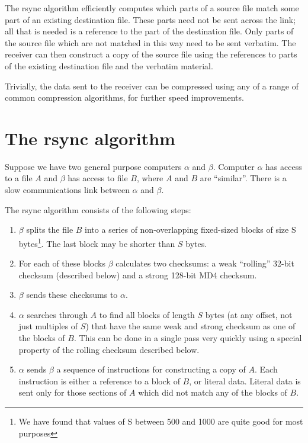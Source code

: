 \documentclass[a4paper]{article}
\begin{document}
The rsync algorithm efficiently computes which parts of a source file
match some part of an existing destination file.  These parts need not
be sent across the link; all that is needed is a reference to the part
of the destination file.  Only parts of the source file which are not
matched in this way need to be sent verbatim.  The receiver can then
construct a copy of the source file using the references to parts of
the existing destination file and the verbatim material.

Trivially, the data sent to the receiver can be compressed using any
of a range of common compression algorithms, for further speed
improvements.

\section{The rsync algorithm}

Suppose we have two general purpose computers $\alpha$ and $\beta$.
Computer $\alpha$ has access to a file $A$ and $\beta$ has access to
file $B$, where $A$ and $B$ are ``similar''.  There is a slow
communications link between $\alpha$ and $\beta$.

The rsync algorithm consists of the following steps:

\begin{enumerate}
\item $\beta$ splits the file $B$ into a series of non-overlapping
  fixed-sized blocks of size S bytes\footnote{We have found that
  values of S between 500 and 1000 are quite good for most purposes}.
  The last block may be shorter than $S$ bytes.

\item For each of these blocks $\beta$ calculates two checksums:
  a weak ``rolling'' 32-bit checksum (described below) and a strong
  128-bit MD4 checksum.

\item $\beta$ sends these checksums to $\alpha$.
  
\item $\alpha$ searches through $A$ to find all blocks of length $S$
  bytes (at any offset, not just multiples of $S$) that have the same
  weak and strong checksum as one of the blocks of $B$. This can be
  done in a single pass very quickly using a special property of the
  rolling checksum described below.
  
\item $\alpha$ sends $\beta$ a sequence of instructions for
  constructing a copy of $A$.  Each instruction is either a reference
  to a block of $B$, or literal data.  Literal data is sent only for
  those sections of $A$ which did not match any of the blocks of $B$.
\end{enumerate}
\end{document}
